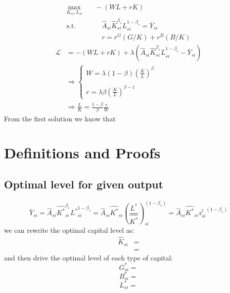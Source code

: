 \documentclass[12pt]{article} %
\begin{document}
\begin{align*}
    \max_{K_{si},L_{si}}&  \quad
        - 		(WL + rK) \quad \\
    \text{s.t.}& \quad \quad \hat{A}_{si}\hat{K}_{si}^{\beta_s} L_{si}^{1-\beta_s} = \bar{Y}_{si}\\
    & \quad \quad r = r^G ({G}/{K}) + r^B ({B}/{K})
\end{align*}
\begin{align*}
    \mathcal{L} & = - (WL + rK) + \lambda (\hat{A}_{si}\hat{K}_{si}^{\beta_s} L_{si}^{1-\beta_s} - \bar{Y}_{si})\\
    & \Rightarrow \left\{\begin{array}{l}
        W = \lambda (1-\beta) (\frac{K}{L})^{\beta}\\\\
        r = \lambda \beta (\frac{K}{L})^{\beta-1}
    \end{array}\right.\\
    & \Rightarrow \frac{L}{K} = \frac{1-\beta}{\beta} \frac{r}{W}
\end{align*}
From the first solution we know that 
\section{Definitions and Proofs} 
\subsection{Optimal level for given output} \label{Ap:optimal level for given output}
\begin{equation*}
    \bar{Y}_{si} = \hat{A}_{si} \hat{K^*}_{si}^{\beta_s} {L^*}_{si}^{1-\beta_s} = \hat{A}_{si} \hat{K^*}_{si} ({\frac{L^*}{\hat{K^*}}})_{si}^{(1-\beta_s)}= \hat{A}_{si} \hat{K^*}_{si} {z_{si}^l}^{(1-\beta_s)}
\end{equation*}
we can rewrite the optimal capital level as:
\begin{equation*}
    \begin{split}
        \hat{K}_{si} &= \\
        & = 
    \end{split}
\end{equation*}
and then drive the optimal level of each type of capital:
\begin{equation*}
    G_{si}^* = 
\end{equation*}
\begin{equation*}
    B_{si}^* = 
\end{equation*}
\begin{equation*}
    L_{si}^* = 
\end{equation*}
\end{document}
